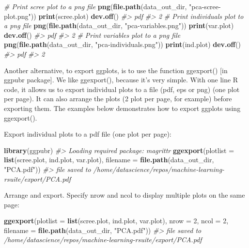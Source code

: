 \documentclass[]{book}
\newenvironment{Shaded}{\begin{snugshade}}{\end{snugshade}}
\newcommand{\CommentTok}[1]{\textcolor[rgb]{0.56,0.35,0.01}{\textit{#1}}}
\newcommand{\DataTypeTok}[1]{\textcolor[rgb]{0.13,0.29,0.53}{#1}}
\newcommand{\DecValTok}[1]{\textcolor[rgb]{0.00,0.00,0.81}{#1}}
\newcommand{\KeywordTok}[1]{\textcolor[rgb]{0.13,0.29,0.53}{\textbf{#1}}}
\newcommand{\NormalTok}[1]{#1}
\newcommand{\StringTok}[1]{\textcolor[rgb]{0.31,0.60,0.02}{#1}}
\begin{document}
\begin{Shaded}
\begin{Highlighting}[]
\CommentTok{# Print scree plot to a png file}
\KeywordTok{png}\NormalTok{(}\KeywordTok{file.path}\NormalTok{(data_out_dir, }\StringTok{"pca-scree-plot.png"}\NormalTok{))}
\KeywordTok{print}\NormalTok{(scree.plot)}
\KeywordTok{dev.off}\NormalTok{()}
\CommentTok{#> pdf }
\CommentTok{#>   2}
\CommentTok{# Print individuals plot to a png file}
\KeywordTok{png}\NormalTok{(}\KeywordTok{file.path}\NormalTok{(data_out_dir, }\StringTok{"pca-variables.png"}\NormalTok{))}
\KeywordTok{print}\NormalTok{(var.plot)}
\KeywordTok{dev.off}\NormalTok{()}
\CommentTok{#> pdf }
\CommentTok{#>   2}
\CommentTok{# Print variables plot to a png file}
\KeywordTok{png}\NormalTok{(}\KeywordTok{file.path}\NormalTok{(data_out_dir, }\StringTok{"pca-individuals.png"}\NormalTok{))}
\KeywordTok{print}\NormalTok{(ind.plot)}
\KeywordTok{dev.off}\NormalTok{()}
\CommentTok{#> pdf }
\CommentTok{#>   2}
\end{Highlighting}
\end{Shaded}

Another alternative, to export ggplots, is to use the function ggexport() {[}in ggpubr package{]}. We like ggexport(), because it's very simple. With one line R code, it allows us to export individual plots to a file (pdf, eps or png) (one plot per page). It can also arrange the plots (2 plot per page, for example) before exporting them. The examples below demonstrates how to export ggplots using ggexport().

Export individual plots to a pdf file (one plot per page):

\begin{Shaded}
\begin{Highlighting}[]
\KeywordTok{library}\NormalTok{(ggpubr)}
\CommentTok{#> Loading required package: magrittr}
\KeywordTok{ggexport}\NormalTok{(}\DataTypeTok{plotlist =} \KeywordTok{list}\NormalTok{(scree.plot, ind.plot, var.plot), }
         \DataTypeTok{filename =} \KeywordTok{file.path}\NormalTok{(data_out_dir, }\StringTok{"PCA.pdf"}\NormalTok{))}
\CommentTok{#> file saved to /home/datascience/repos/machine-learning-rsuite/export/PCA.pdf}
\end{Highlighting}
\end{Shaded}

Arrange and export. Specify nrow and ncol to display multiple plots on the same page:

\begin{Shaded}
\begin{Highlighting}[]
\KeywordTok{ggexport}\NormalTok{(}\DataTypeTok{plotlist =} \KeywordTok{list}\NormalTok{(scree.plot, ind.plot, var.plot), }
         \DataTypeTok{nrow =} \DecValTok{2}\NormalTok{, }\DataTypeTok{ncol =} \DecValTok{2}\NormalTok{,}
         \DataTypeTok{filename =} \KeywordTok{file.path}\NormalTok{(data_out_dir, }\StringTok{"PCA.pdf"}\NormalTok{))}
\CommentTok{#> file saved to /home/datascience/repos/machine-learning-rsuite/export/PCA.pdf}
\end{Highlighting}
\end{Shaded}
\end{document}
